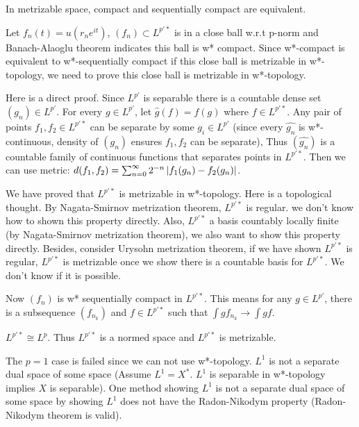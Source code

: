 \begin{remark}
    In metrizable space, compact and sequentially compact are equivalent.\par
    Let $f_n(t)=u(r_ne^{i t})$, $(f_n)\subset L^{p'*}$ is in a close ball w.r.t p-norm and Banach-Alaoglu theorem indicates this ball is w* compact. Since w*-compact is equivalent
    to w*-sequentially compact if this close ball is metrizable in w*-topology, we need to prove this close ball is metrizable in w*-topology.\par
    Here is a direct proof. Since $L^{p'}$ is separable there is a countable dense set $(g_n)\in L^{p'}$. For every $g\in L^{p'}$, let $\hat{g}(f)=f(g)$ where $f\in L^{p'*}$. Any pair of points $f_1,f_2\in L^{p'*}$ can be separate
    by some $g_i\in L^{p'}$ (since every $\hat{g_n}$ is w*-continuous, density of $(g_n)$ ensures $f_1,f_2$ can be separate),
    Thus $(\hat{g_n})$ is a countable family of continuous functions that separates points in $L^{p'*}$.
    Then we can use metric: $d(f_1,f_2)=\sum_{n=0}^\infty{2^{-n}\left\lvert f_1(g_n)-f_2(g_n)\right\rvert}$.\par
    {\color{blue}We have proved that $L^{p'*}$ is metrizable in w*-topology. Here is a topological thought.  By Nagata-Smirnov metrization theorem, $L^{p'*}$ is regular. we don't know how to shown this property directly. Also, $L^{p'*}$ a basis countably locally finite (by Nagata-Smirnov metrization theorem), we also want to show this property directly. Besides, consider Urysohn metrization theorem, if we have shown $L^{p'*}$ is regular, $L^{p'*}$ is metrizable once we show there is a countable basis for $L^{p'*}$. We don't know if it is possible}.\par
    Now $(f_n)$ is w* sequentially compact in $L^{p'*}$. This means for any $g\in L^{p'}$, there is a subsequence $(f_{n_k})$
    and $f\in L^{p'*}$ such that $\int gf_{n_k}\to\int gf$.
\end{remark}
\begin{remark}
    $L^{p'*}\cong L^p$. Thus $L^{p'*}$ is a normed space and $L^{p'*}$ is metrizable.
\end{remark}
The $p=1$ case is failed since we can not use w*-topology. $L^1$ is not a separate dual space of some space (Assume $L^1=X^*$. $L^1$ is separable in w*-topology implies $X$ is separable).
    {\color{blue} One method showing $L^1$ is not  a separate dual space of some space by showing $L^1$ does not have the Radon-Nikodym property (Radon-Nikodym theorem is valid).}
